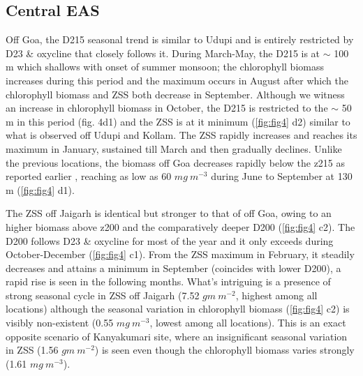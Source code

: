 \documentclass{article}
\begin{document}
	\subsection{Central EAS}
	Off Goa, the D215 seasonal trend is similar to Udupi and is entirely restricted by D23 \& oxycline that closely follows it. During March-May, the D215 is at $\sim$ 100 m which shallows with onset of summer monsoon; the chlorophyll biomass increases during this period and the maximum occurs in August after which the chlorophyll biomass and ZSS both decrease in September. Although we witness an increase in chlorophyll biomass in October, the D215 is restricted to the $\sim$ 50 m in this period (fig. 4d1) and the ZSS is at it minimum (\cref{fig:fig4} d2) similar to what is observed off Udupi and Kollam. The ZSS rapidly increases and reaches its maximum in January, sustained till March and then gradually declines. Unlike the previous locations, the biomass off Goa decreases rapidly below the z215 as reported earlier \citep{aparna2022seasonal}, reaching as low as 60 $mg \ m^{-3}$ during June to September at 130 m (\cref{fig:fig4} d1).
	 

	
	The ZSS off Jaigarh is identical but stronger to that of off Goa, owing to an higher biomass above z200 and the comparatively deeper D200 (\cref{fig:fig4} c2). The D200 follows D23 \& oxycline for most of the year and it only exceeds during October-December (\cref{fig:fig4} c1).  From the ZSS maximum in February, it steadily decreases and attains a minimum in September (coincides with lower D200), a rapid rise is seen in the following months. What's intriguing is a presence of strong seasonal cycle in ZSS off Jaigarh (7.52 $gm\ m^{-2}$, highest among all locations) although the seasonal variation in chlorophyll biomass (\cref{fig:fig4} c2) is visibly non-existent (0.55 $mg\ m^{-3}$, lowest among all locations). This is an exact opposite scenario of Kanyakumari site, where an insignificant seasonal variation in ZSS (1.56 $gm\ m^{-2}$) is seen even though the chlorophyll biomass varies strongly (1.61 $mg\ m^{-3}$). 
		
\end{document}
